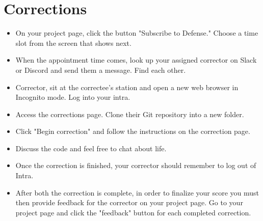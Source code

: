 \documentclass{42-en}
\begin{document}
\chapter{Corrections}
\begin{itemize}
	\item On your project page, click the button "Subscribe to Defense." Choose a time slot from the screen that shows next.

	\item When the appointment time comes, look up your assigned corrector on Slack or Discord and send them a message. Find each other.

	\item Corrector, sit at the correctee's station and open a new web browser in Incognito mode. Log into your intra.

	\item Access the corrections page. Clone their Git repository into a new folder.

	\item Click "Begin correction" and follow the instructions on the correction page.

	\item Discuss the code and feel free to chat about life.

	\item Once the correction is finished, your corrector should remember to log out of Intra.

	\item After both the correction is complete, in order to finalize your score you must then provide feedback for the corrector on your project page. Go to your project page and click the "feedback" button for each completed correction.

\end{itemize}

\end{document}
